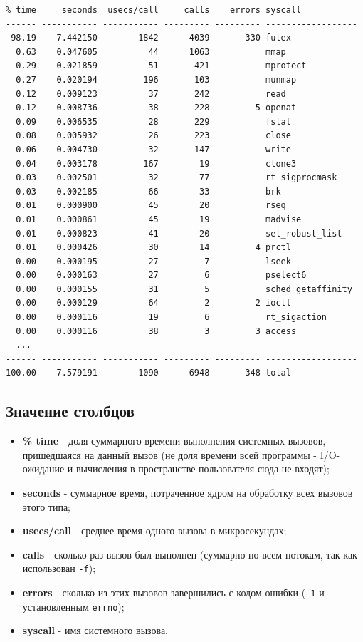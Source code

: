 \documentclass[12pt,a4paper]{article}
\begin{document}
\begin{lstlisting}
% time     seconds  usecs/call     calls    errors syscall
------ ----------- ----------- --------- --------- ------------------
 98.19    7.442150        1842      4039       330 futex
  0.63    0.047605          44      1063           mmap
  0.29    0.021859          51       421           mprotect
  0.27    0.020194         196       103           munmap
  0.12    0.009123          37       242           read
  0.12    0.008736          38       228         5 openat
  0.09    0.006535          28       229           fstat
  0.08    0.005932          26       223           close
  0.06    0.004730          32       147           write
  0.04    0.003178         167        19           clone3
  0.03    0.002501          32        77           rt_sigprocmask
  0.03    0.002185          66        33           brk
  0.01    0.000900          45        20           rseq
  0.01    0.000861          45        19           madvise
  0.01    0.000823          41        20           set_robust_list
  0.01    0.000426          30        14         4 prctl
  0.00    0.000195          27         7           lseek
  0.00    0.000163          27         6           pselect6
  0.00    0.000155          31         5           sched_getaffinity
  0.00    0.000129          64         2         2 ioctl
  0.00    0.000116          19         6           rt_sigaction
  0.00    0.000116          38         3         3 access
  ...
------ ----------- ----------- --------- --------- ------------------
100.00    7.579191        1090      6948       348 total
\end{lstlisting}

\subsection{Значение столбцов}
\begin{itemize}
    \item \textbf{\% time} - доля суммарного времени выполнения системных вызовов,
          пришедшаяся на данный вызов (не доля времени всей программы - I/O-ожидание
          и вычисления в пространстве пользователя сюда не входят);
    \item \textbf{seconds} - суммарное время, потраченное ядром на обработку всех
          вызовов этого типа;
    \item \textbf{usecs/call} - среднее время одного вызова в микросекундах;
    \item \textbf{calls} - сколько раз вызов был выполнен (суммарно по всем потокам,
          так как использован \texttt{-f});
    \item \textbf{errors} - сколько из этих вызовов завершились с кодом ошибки
          (\texttt{-1} и установленным \texttt{errno});
    \item \textbf{syscall} - имя системного вызова.
\end{itemize}
\end{document}
